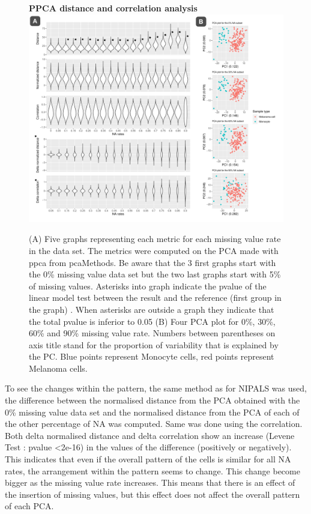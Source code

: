 \documentclass[a4paper, 11pt, twocolumn]{article}
\begin{document}
\begin{figure}[!ht]
   \textbf{PPCA distance and correlation analysis}
    \centering
    \includegraphics[width = \linewidth]{ppca_combined.pdf}
    \caption{\small (A) Five graphs representing each metric for each missing value rate in the data set. \scriptsize The metrics were computed on the PCA made with ppca from pcaMethods. Be aware that the 3 first graphs start with the 0\% missing value data set but the two last graphs start with 5\% of missing values. Asterisks into graph indicate the pvalue of the linear model test between the result and the reference (first group in the graph) . When asterisks are outside a graph they indicate that the total pvalue is inferior to 0.05
    \small (B) Four PCA plot for 0\%, 30\%, 60\% and 90\% missing value rate. \scriptsize Numbers between parentheses on axis title stand for the proportion of variability that is explained by the PC. Blue points represent Monocyte cells, red points represent Melanoma cells.}
    \label{corr_dist_ppca}
\end{figure}

To see the changes within the pattern, the same method as for NIPALS was used, the difference between the normalised distance from the PCA obtained with the 0\% missing value data set and the normalised distance from the PCA of each of the other percentage of NA was computed. Same was done using the correlation. Both delta normalised distance and delta correlation show an increase (Levene Test : pvalue <2e-16) in the values of the difference (positively or negatively). This indicates that even if the overall pattern of the cells is similar for all NA rates, the arrangement within the pattern seems to change. This change become bigger as the missing value rate increases. This means that there is an effect of the insertion of missing values, but this effect does not affect the overall pattern of each PCA.
\end{document}
